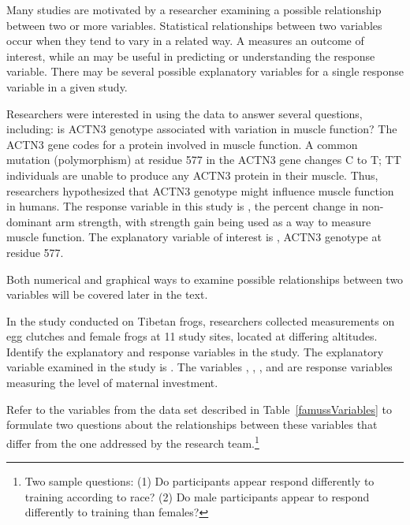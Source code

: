 Many studies are motivated by a researcher examining a possible relationship between two or more variables. Statistical relationships between two variables occur when they tend to vary in a related way. A  measures an outcome of interest, while an  may be useful in predicting or understanding the response variable. There may be several possible explanatory variables for a single response variable in a given study.

Researchers were interested in using the  data to answer several questions, including: is ACTN3 genotype associated with variation in muscle function? The ACTN3 gene codes for a protein involved in muscle function. A common mutation (polymorphism) at residue 577 in the ACTN3 gene changes C to T; TT individuals are unable to produce any ACTN3 protein in their muscle. Thus, researchers hypothesized that ACTN3 genotype might influence muscle function in humans. The response variable in this study is , the percent change in non-dominant arm strength, with strength gain being used as a way to measure muscle function. The explanatory variable of interest is , ACTN3 genotype at residue 577.  

Both numerical and graphical ways to examine possible relationships between two variables will be covered later in the text.

\begin{example}{In the study conducted on Tibetan frogs, researchers collected measurements on egg clutches and female frogs at 11 study sites, located at differing altitudes. Identify the explanatory and response variables in the study.}
The explanatory variable examined in the study is . The variables , , , and  are response variables measuring the level of maternal investment. 
\end{example}	

\begin{exercise}
Refer to the variables from the  data set described in Table~\ref{famussVariables} to formulate two questions about the relationships between these variables that differ from the one addressed by the research team.\footnote{Two sample questions: (1)  Do participants appear respond differently to training according to race?  (2)  Do male participants appear to respond differently to training than females?}
\end{exercise}



